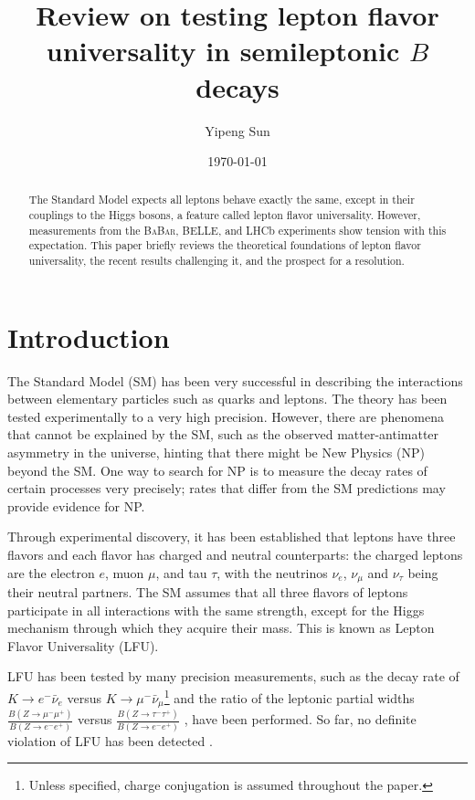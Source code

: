 \documentclass[12pt,letterpaper]{article}
\title{Review on testing lepton flavor universality in semileptonic $B$ decays}
\author{Yipeng Sun}
\affil{Department of Physics, University of Maryland}
\date{\today}
\def\BaBar/{\textsc{BaBar}}
\begin{document}
\maketitle

\begin{abstract}
    The Standard Model expects all leptons behave exactly the same, except in
    their couplings to the Higgs bosons, a feature called lepton flavor
    universality.
    However, measurements from the \BaBar/, BELLE, and LHCb experiments show
    tension with this expectation.
    This paper briefly reviews the theoretical foundations of lepton flavor
    universality, the recent results challenging it, and the prospect for a
    resolution.
\end{abstract}

\section{Introduction}
The Standard Model (SM) has been very successful in describing the interactions
between elementary particles such as quarks and leptons.
The theory has been tested experimentally to a very high precision.
However, there are phenomena that cannot be explained by the SM, such as
the observed matter-antimatter asymmetry in the universe, hinting that there
might be New Physics (NP) beyond the SM.
One way to search for NP is to measure the decay rates of certain processes
very precisely;
rates that differ from the SM predictions may provide evidence for NP.

Through experimental discovery, it has been established that leptons have three
flavors and each flavor has charged and neutral counterparts:
the charged leptons are the electron $e$, muon $\mu$, and tau $\tau$,
with the neutrinos $\nu_e$, $\nu_\mu$ and $\nu_\tau$ being their neutral
partners.
The SM assumes that all three flavors of leptons participate in all
interactions with the same strength, except for the Higgs mechanism through
which they acquire their mass.
This is known as Lepton Flavor Universality (LFU).

LFU has been tested by many precision measurements, such as the decay rate
of $K \rightarrow e^- \bar{\nu}_e$ versus
$K \rightarrow \mu^- \bar{\nu}_\mu$\footnote{
    Unless specified, charge conjugation is assumed throughout the paper.
} \cite{Ciezarek:2017yzh} and the ratio of the leptonic partial widths
$\frac{B(Z \rightarrow \mu^- \mu^+)}{B(Z \rightarrow e^- e^+)}$ versus
$\frac{B(Z \rightarrow \tau^- \tau^+)}{B(Z \rightarrow e^- e^+)}$
\cite{ALEPH:2005ab}, have been performed.
So far, no definite violation of LFU has been detected .
\end{document}
